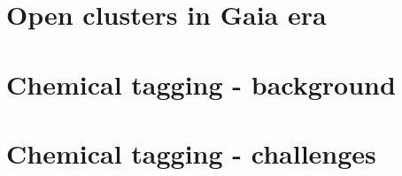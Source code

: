 \section{Open clusters in Gaia era}

\section{Chemical tagging - background}

\section{Chemical tagging - challenges}

